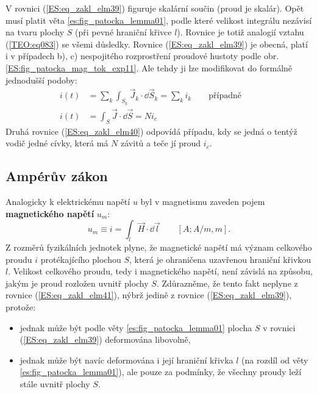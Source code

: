         V rovnici (\ref{ES:eq_zakl_elm39}) figuruje skalární součin (proud je skalár). Opět musí 
        platit věta \ref{es:fig_patocka_lemma01}, podle které velikost integrálu nezávisí na tvaru 
        plochy \(S\) (při pevné hraniční křivce \(l\)). Rovnice je totiž analogií vztahu 
        (\ref{TEO:eq083}) se všemi důsledky. Rovnice (\ref{ES:eq_zakl_elm39}) je obecná, 
        platí i v případech b), c) nespojitého rozprostření proudové hustoty podle obr. 
        \ref{ES:fig_patocka_mag_tok_exp11}. Ale tehdy ji lze modifikovat do formálně jednodušší 
        podoby:
        \begin{align}
          i(t) &= \sum_k\int_{S_k}\vec{J}_k\cdot \dd{\vec{S}}_k = \sum_k i_k 
                  \qquad\text{případně}\qquad                         \nonumber \\
          i(t) &= \int_S\vec{J}\cdot \dd{\vec{S}} = Ni_c                  \label{ES:eq_zakl_elm40}
        \end{align} 
        Druhá rovnice (\ref{ES:eq_zakl_elm40}) odpovídá případu, kdy se jedná o tentýž vodič jedné 
        cívky, která má \(N\) závitů a teče jí proud \(i_c\).
      
      \subsection{Ampérův zákon}
        Analogicky k elektrickému napětí \(u\) byl v magnetismu zaveden pojem \textbf{magnetického 
        napětí} \(u_m\):
        \begin{equation}\label{ES:eq_zakl_elm41}
          u_m \equiv i = \int_l \vec{H}\cdot \dd{\vec{l}} \qquad [A; A/m, m].
        \end{equation} 
        Z rozměrů fyzikálních jednotek plyne, že magnetické napětí má význam celkového proudu \(i\) 
        protékajícího plochou \(S\), která je ohraničena uzavřenou hraniční křivkou \(l\). Velikost 
        celkového proudu, tedy i magnetického napětí, není závislá na způsobu, jakým je proud 
        rozložen uvnitř plochy \(S\). Zdůrazněme, že tento fakt neplyne z rovnice 
        (\ref{ES:eq_zakl_elm41}), nýbrž jedině z rovnice (\ref{ES:eq_zakl_elm39}), protože:
        \begin{itemize}         
          \item jednak může být podle věty \ref{es:fig_patocka_lemma01} plocha \(S\) v rovnici 
                (\ref{ES:eq_zakl_elm39}) deformována libovolně,
          \item jednak může být navíc deformována i její hraniční křivka \(l\) (na rozdíl od věty 
                \ref{es:fig_patocka_lemma01}), ale pouze za podmínky, že všechny proudy leží stále 
                uvnitř plochy \(S\).
        \end{itemize}
        
